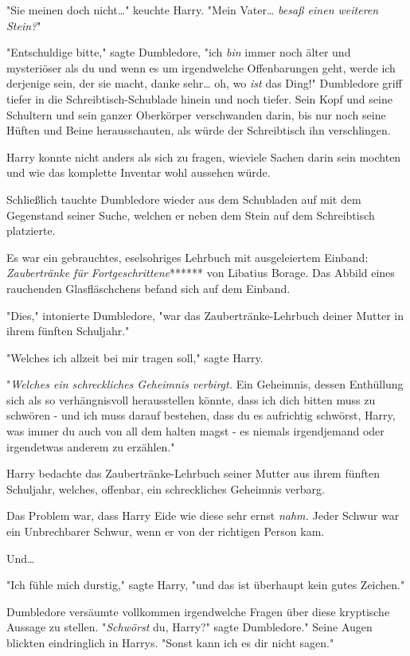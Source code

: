 {"Sie meinen doch nicht…" keuchte Harry. "Mein Vater… \emph{besaß einen weiteren Stein?}"

"Entschuldige bitte," sagte Dumbledore, "ich \emph{bin} immer noch älter und mysteriöser als du und wenn es um irgendwelche Offenbarungen geht, werde ich derjenige sein, der sie macht, danke sehr… oh, wo \emph{ist} das Ding!" Dumbledore griff tiefer in die Schreibtisch-Schublade hinein und noch tiefer. Sein Kopf und seine Schultern und sein ganzer Oberkörper verschwanden darin, bis nur noch seine Hüften und Beine herausschauten, als würde der Schreibtisch ihn verschlingen.

Harry konnte nicht anders als sich zu fragen, wieviele Sachen darin sein mochten und wie das komplette Inventar wohl aussehen würde.

Schließlich tauchte Dumbledore wieder aus dem Schubladen auf mit dem Gegenstand seiner Suche, welchen er neben dem Stein auf dem Schreibtisch platzierte.

Es war ein gebrauchtes, eselsohriges Lehrbuch mit ausgeleiertem Einband: \emph{Zaubertränke für Fortgeschrittene}****** von Libatius Borage. Das Abbild eines rauchenden Glasfläschchens befand sich auf dem Einband.

"Dies," intonierte Dumbledore, "war das Zaubertränke-Lehrbuch deiner Mutter in ihrem fünften Schuljahr."

"Welches ich allzeit bei mir tragen soll," sagte Harry.

"\emph{Welches ein schreckliches Geheimnis verbirgt.} Ein Geheimnis, dessen Enthüllung sich als so verhängnisvoll herausstellen könnte, dass ich dich bitten muss zu schwören - und ich muss darauf bestehen, dass du es aufrichtig schwörst, Harry, was immer du auch von all dem halten magst - es niemals irgendjemand oder irgendetwas anderem zu erzählen."

Harry bedachte das Zaubertränke-Lehrbuch seiner Mutter aus ihrem fünften Schuljahr, welches, offenbar, ein schreckliches Geheimnis verbarg.

Das Problem war, dass Harry Eide wie diese sehr ernst \emph{nahm.} Jeder Schwur war ein Unbrechbarer Schwur, wenn er von der richtigen Person kam.

Und…

"Ich fühle mich durstig," sagte Harry, "und das ist überhaupt kein gutes Zeichen."

Dumbledore versäumte vollkommen irgendwelche Fragen über diese kryptische Aussage zu stellen. "\emph{Schwörst} du, Harry?" sagte Dumbledore." Seine Augen blickten eindringlich in Harrys. "Sonst kann ich es dir nicht sagen."

}
